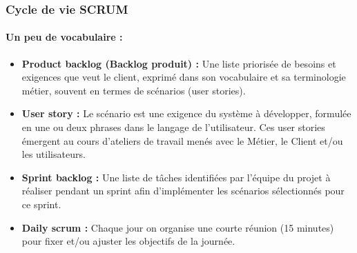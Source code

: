 \subsubsection{Cycle de vie SCRUM}
\paragraph{Un peu de vocabulaire :}
\begin{itemize}
    \item \textbf{Product backlog (Backlog produit) : } Une liste priorisée de besoins et exigences que veut le client, exprimé dans son vocabulaire et sa terminologie métier, souvent en termes de scénarios (user stories).
    \item \textbf{User story : }Le scénario est une exigence du système à développer, formulée en une ou deux phrases dans le langage de l'utilisateur. Ces user stories émergent au cours d'ateliers de travail menés avec le Métier, le Client et/ou les utilisateurs.
    \item \textbf{Sprint backlog : }Une liste de tâches identifiées par l'équipe du projet à réaliser pendant un sprint afin d'implémenter les scénarios sélectionnés pour ce sprint.
    \item \textbf{Daily scrum : }Chaque jour on organise une courte réunion (15 minutes) pour fixer et/ou ajuster les objectifs de la journée.
\end{itemize}

